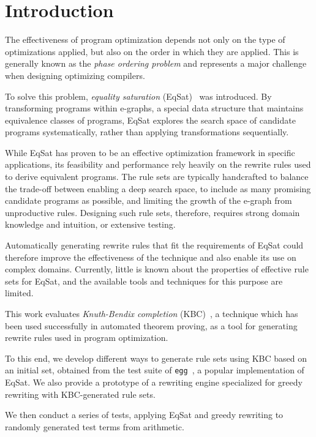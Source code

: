 \chapter{Introduction}
\label{chap:introduction}

The effectiveness of program optimization depends not only on the type of optimizations applied, but also on the order in which they are applied. This is generally known as the \emph{phase ordering problem} and represents a major challenge when designing optimizing compilers. 

To solve this problem, \emph{equality saturation} (EqSat)~\cite{Tate_2011, Willsey_2021} was introduced. By transforming programs within e-graphs, a special data structure that maintains equivalence classes of programs, EqSat explores the search space of candidate programs systematically, rather than applying transformations sequentially.

While EqSat has proven to be an effective optimization framework in specific applications, its feasibility and performance rely heavily on the rewrite rules used to derive equivalent programs. The rule sets are typically handcrafted to balance the trade-off between enabling a deep search space, to include as many promising candidate programs as possible, and limiting the growth of the e-graph from unproductive rules. Designing such rule sets, therefore, requires strong domain knowledge and intuition, or extensive testing.

Automatically generating rewrite rules that fit the requirements of EqSat could therefore improve the effectiveness of the technique and also enable its use on complex domains. Currently, little is known about the properties of effective rule sets for EqSat, and the available tools and techniques for this purpose are limited.

This work evaluates \emph{Knuth-Bendix completion} (KBC)~\citep{10.1093/comjnl/34.1.2}, a technique which has been used successfully in automated theorem proving, as a tool for generating rewrite rules used in program optimization. 

To this end, we develop different ways to generate rule sets using KBC based on an initial set, obtained from the test suite of \texttt{egg}~\cite{Willsey_2021}, a popular implementation of EqSat. We also provide a prototype of a rewriting engine specialized for greedy rewriting with KBC-generated rule sets.

We then conduct a series of tests, applying EqSat and greedy rewriting to randomly generated test terms from arithmetic.

